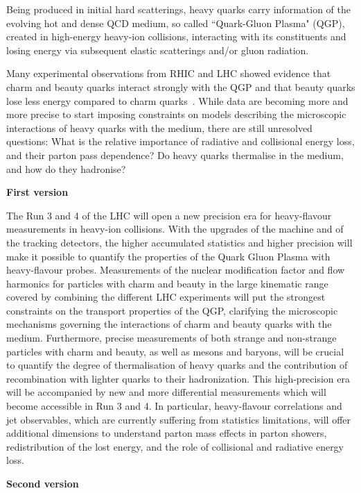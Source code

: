 Being produced in initial hard scatterings, heavy quarks carry information of  the evolving hot and dense QCD medium, so called ``Quark-Gluon Plasma" (QGP), created in high-energy heavy-ion collisions, interacting with its constituents and losing energy via subsequent elastic scatterings and/or gluon radiation. 

Many experimental observations from RHIC and LHC showed evidence that charm and beauty quarks interact strongly with the QGP and that beauty quarks lose less energy compared to charm quarks~\cite{Adam:2015nna,Khachatryan:2016ypw}. 
While data are becoming more and more precise to start imposing constraints on models describing the microscopic interactions of heavy quarks with the medium, there are still unresolved questions:  What is the relative importance of radiative and collisional energy loss, and their parton pass dependence? 
Do heavy quarks thermalise in the medium, and how do they hadronise? 

\textbf{First version}

The Run 3 and 4 of the LHC will open a new precision era for heavy-flavour measurements in heavy-ion collisions. 
With the upgrades of the machine and of the tracking detectors, the higher accumulated statistics and higher precision will make it possible to quantify the properties of the Quark Gluon Plasma with heavy-flavour probes. Measurements of the nuclear modification factor and flow harmonics for particles with charm and beauty in the large kinematic range covered by combining the different LHC experiments will put the strongest constraints on the transport properties of the QGP, clarifying the microscopic mechanisms governing the interactions of charm and beauty quarks with the medium.
Furthermore, precise measurements of both strange and non-strange particles with charm and beauty, as well as mesons and baryons, will be crucial to quantify the degree of thermalisation of heavy quarks and the contribution of recombination with lighter quarks to their hadronization. This high-precision era will be accompanied by new and more differential measurements which will become accessible in Run 3 and 4. In particular, heavy-flavour correlations and jet observables, which are currently suffering from statistics limitations, will offer additional dimensions to understand parton mass effects in parton showers, redistribution of the lost energy, and the role of collisional and radiative energy loss.

\textbf{Second version}

